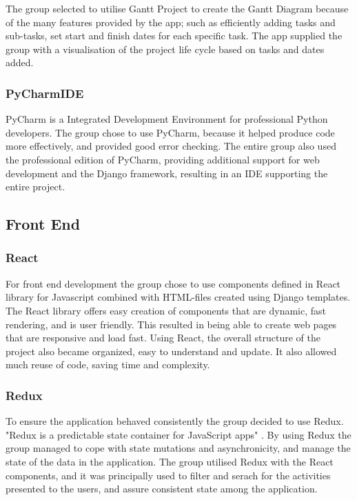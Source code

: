 The group selected to utilise Gantt Project to create the Gantt Diagram because of the many features provided by the app; such as efficiently adding tasks and sub-tasks, set start and finish dates for each specific task. The app supplied the group with a visualisation of the project life cycle based on tasks and dates added.    

\subsubsection{PyCharmIDE}
PyCharm\cite{PyCharm} is a Integrated Development Environment for professional Python developers. The group chose to use PyCharm, because it helped produce code more effectively, and provided good error checking. The entire group also used the professional edition of PyCharm, providing additional support for web development and the Django framework, resulting in an IDE supporting the entire project.

\subsection{Front End}
\label{frontEnd}
\subsubsection{React}
For front end development the group chose to use components defined in React library for Javascript \cite{React} combined with HTML-files created using Django templates. The React library offers easy creation of components that are dynamic, fast rendering, and is user friendly. This resulted in being able to create web pages that are responsive and load fast. Using React, the overall structure of the project also became organized, easy to understand and update. It also allowed much reuse of code, saving time and complexity. 

\subsubsection{Redux}
\label{redux}
To ensure the application behaved consistently the group decided to use Redux. "Redux is a predictable state container for JavaScript apps" \cite{Redux}. By using Redux the group managed to cope with state mutations and asynchronicity, and manage the state of the data in the application. The group utilised Redux with the React components, and it was principally used to filter and serach for the activities presented to the users, and assure consistent state among the application.  

